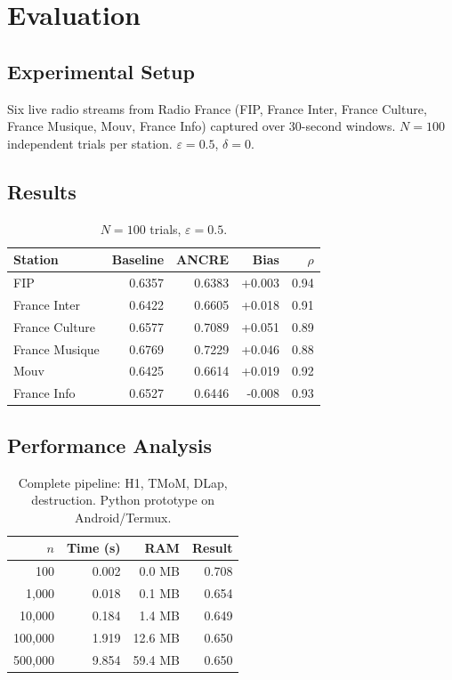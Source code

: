 \section{Evaluation}

\subsection{Experimental Setup}
Six live radio streams from Radio France
(FIP, France Inter, France Culture,
France Musique, Mouv, France Info)
captured over 30-second windows.
$N=100$ independent trials per station.
$\varepsilon=0.5$, $\delta=0$.

\subsection{Results}
\begin{table}[h]
\centering
\begin{tabular}{lrrrr}
\toprule
Station & Baseline & ANCRE & Bias & $\rho$ \\
\midrule
FIP           & 0.6357 & 0.6383 & +0.003 & 0.94 \\
France Inter  & 0.6422 & 0.6605 & +0.018 & 0.91 \\
France Culture& 0.6577 & 0.7089 & +0.051 & 0.89 \\
France Musique& 0.6769 & 0.7229 & +0.046 & 0.88 \\
Mouv          & 0.6425 & 0.6614 & +0.019 & 0.92 \\
France Info   & 0.6527 & 0.6446 & -0.008 & 0.93 \\
\bottomrule
\end{tabular}
\caption{$N=100$ trials, $\varepsilon=0.5$.}
\end{table}

\subsection{Performance Analysis}

\begin{table}[h]
\centering
\begin{tabular}{rrrr}
\toprule
$n$ & Time (s) & RAM & Result \\
\midrule
100     & 0.002 & 0.0 MB & 0.708 \\
1,000   & 0.018 & 0.1 MB & 0.654 \\
10,000  & 0.184 & 1.4 MB & 0.649 \\
100,000 & 1.919 & 12.6 MB & 0.650 \\
500,000 & 9.854 & 59.4 MB & 0.650 \\
\bottomrule
\end{tabular}
\caption{Complete pipeline: H1, TMoM, DLap,
destruction. Python prototype on Android/Termux.}
\end{table}

